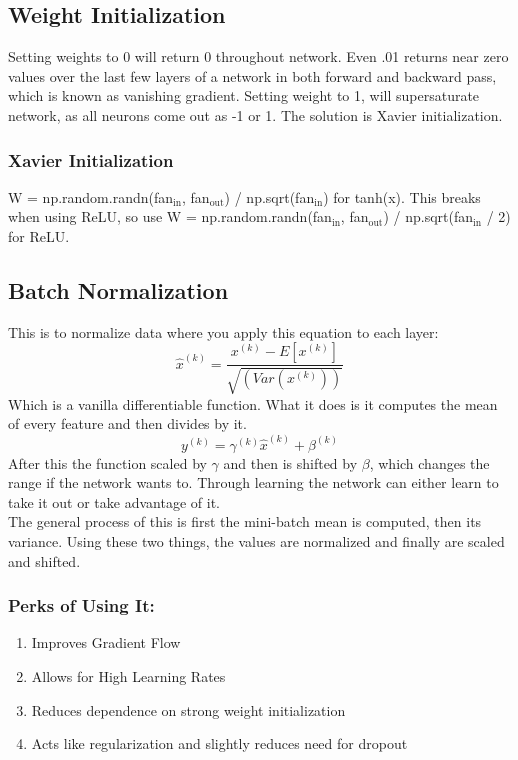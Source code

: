 \documentclass[11pt]{article}
\begin{document}
\begin{enumerate}
\subsection{Weight Initialization}
\label{sec-2-5}
Setting weights to 0 will return 0 throughout network. Even .01 returns near zero values over the last few 
layers of a network in both forward and backward pass, which is known as vanishing gradient. Setting weight to 1, will supersaturate network, as all neurons come out as -1 or 1. The solution is Xavier initialization.
\subsubsection{Xavier Initialization}
\label{sec-2-5-1}
W = np.random.randn(fan$_{\text{in}}$, fan$_{\text{out}}$) / np.sqrt(fan$_{\text{in}}$) for tanh(x). This breaks when using ReLU, so use
W = np.random.randn(fan$_{\text{in}}$, fan$_{\text{out}}$) / np.sqrt(fan$_{\text{in}}$ / 2) for ReLU.
\subsection{Batch Normalization}
\label{sec-2-6}
This is to normalize data where you apply this equation to each layer:
$$\hat{x}^{(k)} = \frac{x^{(k)} - E[x^{(k)}]}{\sqrt{(Var(x^{(k)}))}}$$ 
Which is a vanilla differentiable function. What it does is it computes the mean of every feature and then divides by it.
$$ y^{(k)} = \gamma^{(k)} \hat{x}^{(k)} + \beta^{(k)}$$
After this the function scaled by $\gamma$ and then is shifted by $\beta$, which changes the range if the network wants to. Through learning the network can either learn
to take it out or take advantage of it. \\
The general process of this is first the  mini-batch mean is computed, then its variance. 
Using these two things, the values are normalized and finally are scaled and shifted.
\subsubsection{Perks of Using It:}
\label{sec-2-6-1}
\begin{enumerate}
\item Improves Gradient Flow
\label{sec-2-6-1-1}
\item Allows for High Learning Rates
\label{sec-2-6-1-2}
\item Reduces dependence on strong weight initialization
\label{sec-2-6-1-3}
\item Acts like regularization and slightly reduces need for dropout
\label{sec-2-6-1-4}
\end{enumerate}

\end{enumerate}
\end{document}
